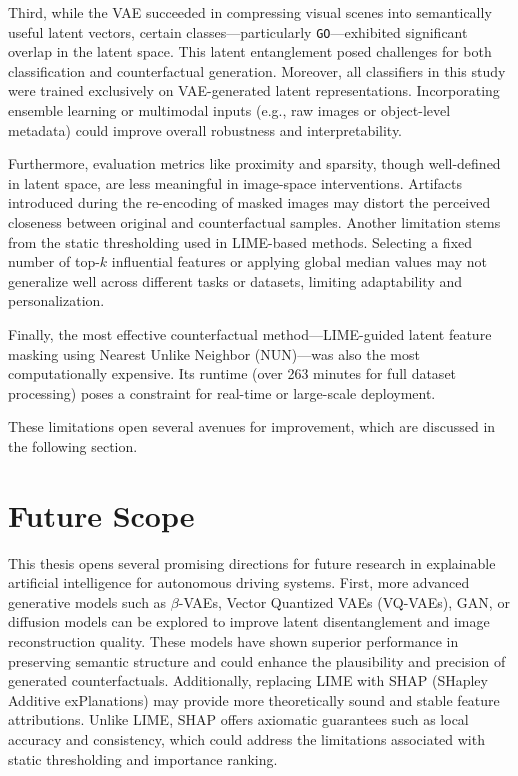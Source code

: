 Third, while the VAE succeeded in compressing visual scenes into semantically useful latent vectors, certain classes—particularly \texttt{GO}—exhibited significant overlap in the latent space. This latent entanglement posed challenges for both classification and counterfactual generation. Moreover, all classifiers in this study were trained exclusively on VAE-generated latent representations. Incorporating ensemble learning or multimodal inputs (e.g., raw images or object-level metadata) could improve overall robustness and interpretability.

Furthermore, evaluation metrics like proximity and sparsity, though well-defined in latent space, are less meaningful in image-space interventions. Artifacts introduced during the re-encoding of masked images may distort the perceived closeness between original and counterfactual samples. Another limitation stems from the static thresholding used in LIME-based methods. Selecting a fixed number of top-$k$ influential features or applying global median values may not generalize well across different tasks or datasets, limiting adaptability and personalization.

Finally, the most effective counterfactual method—LIME-guided latent feature masking using Nearest Unlike Neighbor (NUN)—was also the most computationally expensive. Its runtime (over 263 minutes for full dataset processing) poses a constraint for real-time or large-scale deployment.

These limitations open several avenues for improvement, which are discussed in the following section.


\section{Future Scope} \label{sec:future_scope}

This thesis opens several promising directions for future research in explainable artificial intelligence for autonomous driving systems. First, more advanced generative models such as $\beta$-VAEs, Vector Quantized VAEs (VQ-VAEs), GAN, or diffusion models can be explored to improve latent disentanglement and image reconstruction quality. These models have shown superior performance in preserving semantic structure and could enhance the plausibility and precision of generated counterfactuals. Additionally, replacing LIME with SHAP (SHapley Additive exPlanations) may provide more theoretically sound and stable feature attributions. Unlike LIME, SHAP offers axiomatic guarantees such as local accuracy and consistency, which could address the limitations associated with static thresholding and importance ranking.

